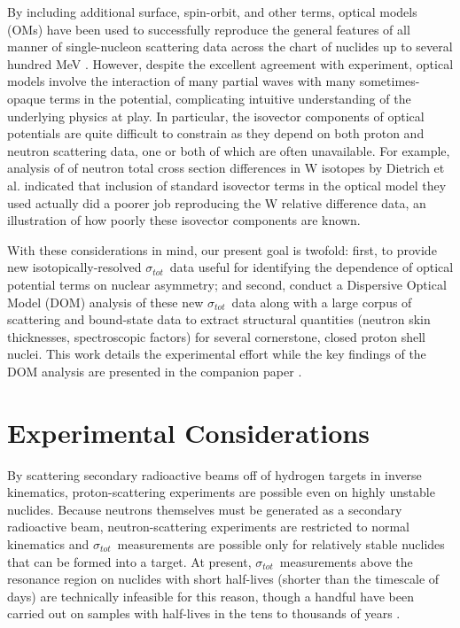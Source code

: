 \documentclass[twocolumn,secnumarabic,amssymb, nobibnotes, aps, prl,
superscriptaddress, nobalancelastpage]{revtex4}
\newcommand{\tot}{\ensuremath{\sigma_{tot}}}
\begin{document}
By including additional surface, spin-orbit, and other terms, optical models (OMs) have been 
used to successfully reproduce the general features of all manner of single-nucleon scattering 
data across the chart of nuclides up to several hundred MeV \cite{Perey1976,
CH89, KoningDelaroche}. However, despite the excellent agreement with experiment, optical models
involve the interaction of many partial waves with many sometimes-opaque terms
in the potential, complicating intuitive understanding of the underlying
physics at play. In particular, the isovector components of optical potentials
are quite difficult to constrain as they depend on both proton and neutron 
scattering data, one or both of which are often unavailable. For example,
analysis of of neutron total cross section differences in W isotopes by Dietrich et al.
\cite{Dietrich2003} indicated that inclusion of standard isovector terms in the optical model they used
actually did a poorer job reproducing the W relative difference data, an
illustration of how poorly these isovector components are known.

With these considerations in mind, our present goal is twofold: first, to
provide new isotopically-resolved \tot\ data useful for identifying the 
dependence of optical 
potential terms on nuclear asymmetry; and second, conduct a Dispersive Optical Model
(DOM) analysis of these new \tot\ data along with a large corpus of scattering
and bound-state data to extract structural quantities (neutron skin
thicknesses, spectroscopic factors) for several cornerstone, closed proton shell nuclei.
This work details the experimental effort while the key findings of the DOM analysis are
presented in the companion paper \cite{Pruitt2020PRL}.


\section{Experimental Considerations}
By scattering secondary radioactive beams off of hydrogen targets in inverse
kinematics, proton-scattering experiments are possible even on highly unstable
nuclides. Because neutrons themselves must be generated as a
secondary radioactive beam, neutron-scattering experiments are restricted to
normal kinematics and \tot\ measurements are possible only for relatively stable
nuclides that can be formed into a target. At present, \tot\ measurements above
the resonance region on nuclides with short half-lives (shorter than the timescale of
days) are technically infeasible for this reason, though a handful have been carried out on
samples with half-lives in the tens to thousands of years \cite{Poenitz1983,
Phillips1980, Foster1971}.
\end{document}

